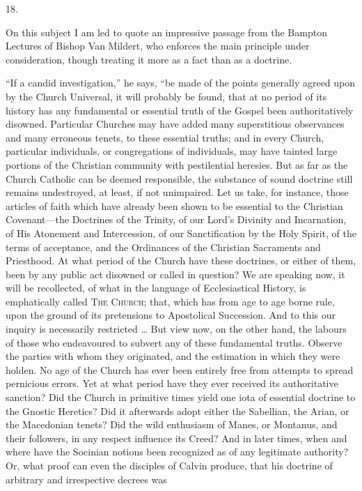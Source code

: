 18.

On this subject I am led to quote an impressive passage from
the Bampton Lectures of Bishop Van Mildert, who enforces the main
principle under consideration, though treating it more as a fact than
as a doctrine.

``If a candid investigation,'' he says, ``be made of
the points generally agreed upon by the Church Universal, it will
probably be found, that at no period of its history has any
fundamental or essential truth of the Gospel been authoritatively
disowned. Particular Churches may have added many superstitious
observances and many erroneous tenets, to these essential truths; and
in every Church, particular individuals, or congregations of
individuals, may have tainted large portions of the Christian
community with pestilential heresies. But as far as the Church
Catholic can be deemed responsible, the substance of sound doctrine
still remains undestroyed, at least, if not unimpaired. Let us take,
for instance, those articles of faith which have already been shown to
be essential to the Christian Covenant—the Doctrines of the Trinity,
of our Lord's Divinity and Incarnation, of His Atonement and
Intercession, of our Sanctification by the Holy Spirit, of the terms
of acceptance, and the Ordinances of the Christian Sacraments and
Priesthood. At what period of the Church have these doctrines, or
either of them, been by any public act disowned or called in question?
We are speaking now, it will be recollected, of what in the language
of Ecclesiastical History, is emphatically called T\textsc{he}
C\textsc{hurch}; that, which has from age to age borne
rule, upon the ground of its pretensions to Apostolical Succession.
And to this our inquiry is necessarily restricted … But view now, on
the other hand, the labours of those who endeavoured to subvert any of
these fundamental truths. Observe the parties with whom they
originated, and the estimation in which they were holden. No age of
the Church has ever been entirely free from attempts to spread
pernicious errors. Yet at what period have they ever received
its authoritative sanction? Did the Church in primitive times yield
one iota of essential doctrine to the Gnostic Heretics? Did it
afterwards adopt either the Sabellian, the Arian, or the Macedonian
tenets? Did the wild enthusiasm of Manes, or Montanus, and their
followers, in any respect influence its Creed? And in later times,
when and where have the Socinian notions been recognized as of any
legitimate authority? Or, what proof can even the disciples of Calvin
produce, that his doctrine of arbitrary and irrespective decrees was
